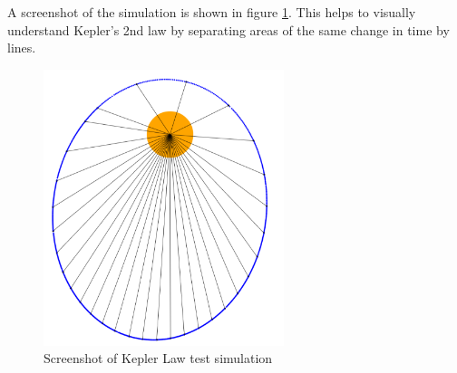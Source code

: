 A screenshot of the simulation is shown in figure \ref{fig:screenshot}.  This helps to visually understand Kepler's 2nd law by separating areas of the same change in time by lines.

\begin{figure}[h] 
	\centering
		\includegraphics[width=7cm]{Figures/keplerscreenshot.png}
	\caption{Screenshot of Kepler Law test simulation}
	\label{fig:screenshot}
\end{figure}































